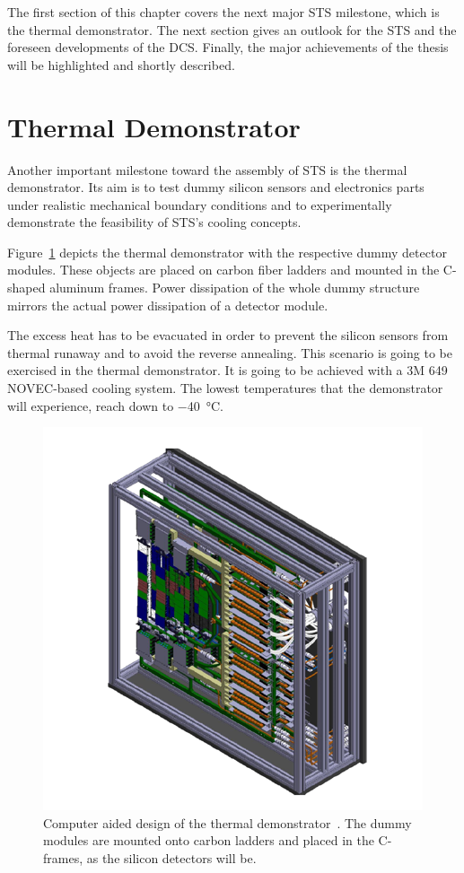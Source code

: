 The first section of this chapter covers the next major \gls{STS} milestone, which is the thermal demonstrator. The next section gives an outlook for the \gls{STS} and the foreseen developments of the \gls{DCS}. Finally, the major achievements of the thesis will be highlighted and shortly described.

\section{Thermal Demonstrator}
Another important milestone toward the assembly of \gls{STS} is the thermal demonstrator. Its aim is to test dummy silicon sensors and electronics parts under realistic mechanical boundary conditions and to experimentally demonstrate the feasibility of \gls{STS}’s cooling concepts. 

Figure~\ref{fig:demo} depicts the thermal demonstrator with the respective dummy detector modules. These objects are placed on carbon fiber ladders and mounted in the C-shaped aluminum frames. Power dissipation of the whole dummy structure mirrors the actual power dissipation of a detector module.

The excess heat has to be evacuated in order to prevent the silicon sensors from thermal runaway and to avoid the reverse annealing. This scenario is going to be exercised in the thermal demonstrator. It is going to be achieved with a 3M 649 NOVEC-based cooling system. The lowest temperatures that the demonstrator will experience, reach down to \SI{-40}{\celsius}. 

\begin{figure}[!h]
    \centering
    \includegraphics[width=0.65\columnwidth]{Chapter7/images/thermal_demo.png}
    \caption{Computer aided design of the thermal demonstrator~\cite{thermal_demo}. The dummy modules are mounted onto carbon ladders and placed in the C-frames, as the silicon detectors will be.}
    \label{fig:demo}
\end{figure}
\label{demo}

